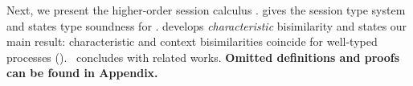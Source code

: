 \smallskip
{} 
Next, 
we present
the higher-order session calculus \HOp. 
 gives the session type system
and states type soundness for \HOp.
{} 
develops %
\emph{characteristic} bisimilarity and 
states our main result: characteristic and context bisimilarities coincide for 
well-typed \HOp processes ().
~concludes with related works. 
\textbf{Omitted definitions and proofs %
can be found in Appendix.
} 

